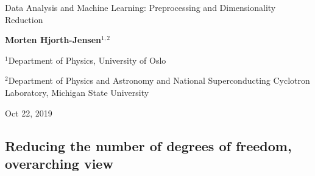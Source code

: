 \documentclass[%
oneside,                 %
final,                   %
10pt]{article}
\begin{document}

\newcommand{\exercisesection}[1]{\subsection*{#1}}






\thispagestyle{empty}

\begin{center}
{\LARGE\bf
\begin{spacing}{1.25}
Data Analysis and Machine Learning: Preprocessing and Dimensionality Reduction
\end{spacing}
}
\end{center}


\begin{center}
{\bf Morten Hjorth-Jensen${}^{1, 2}$} \\ [0mm]
\end{center}

\begin{center}
\centerline{{\small ${}^1$Department of Physics, University of Oslo}}
\centerline{{\small ${}^2$Department of Physics and Astronomy and National Superconducting Cyclotron Laboratory, Michigan State University}}
\end{center}
    

\begin{center}
Oct 22, 2019
\end{center}

\vspace{1cm}


\subsection*{Reducing the number of degrees of freedom, overarching view}

\paragraph{}
\end{document}
